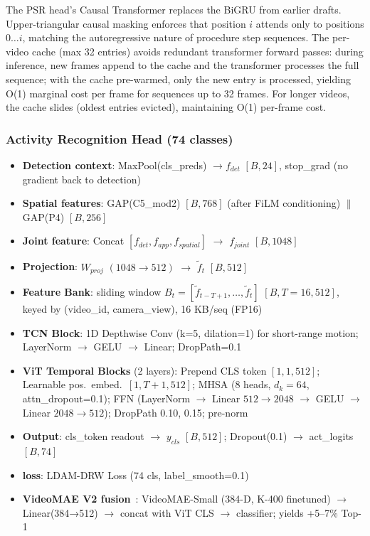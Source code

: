 \documentclass[11pt,a4paper]{article}
\begin{document}
The PSR head's Causal Transformer replaces the BiGRU from earlier drafts. Upper-triangular causal masking enforces that position $i$ attends only to positions $0\ldots i$, matching the autoregressive nature of procedure step sequences. The per-video cache (max 32 entries) avoids redundant transformer forward passes: during inference, new frames append to the cache and the transformer processes the full sequence; with the cache pre-warmed, only the new entry is processed, yielding O(1) marginal cost per frame for sequences up to 32 frames. For longer videos, the cache slides (oldest entries evicted), maintaining O(1) per-frame cost.

\subsubsection{Activity Recognition Head (74 classes)}
\begin{itemize}
\item \textbf{Detection context}: MaxPool(cls\_preds) $\rightarrow f_{det}$ $[B, 24]$, stop\_grad (no gradient back to detection)
\item \textbf{Spatial features}: GAP(C5\_mod2) $[B, 768]$ (after FiLM conditioning) $\|$ GAP(P4) $[B, 256]$
\item \textbf{Joint feature}: Concat $[f_{det}, f_{app}, f_{spatial}]$ $\rightarrow$ $f_{joint}$ $[B, 1048]$
\item \textbf{Projection}: $W_{proj}$ $(1048 \rightarrow 512)$ $\rightarrow$ $\tilde{f}_t$ $[B, 512]$
\item \textbf{Feature Bank}: sliding window $B_t = [\tilde{f}_{t-T+1}, \ldots, \tilde{f}_t]$ $[B, T=16, 512]$, keyed by (video\_id, camera\_view), 16 KB/seq (FP16)
\item \textbf{TCN Block}: 1D Depthwise Conv (k=5, dilation=1) for short-range motion; LayerNorm $\rightarrow$ GELU $\rightarrow$ Linear; DropPath=0.1
\item \textbf{ViT Temporal Blocks} (2 layers): Prepend CLS token $[1, 1, 512]$; Learnable pos.\ embed.\ $[1, T+1, 512]$; MHSA (8 heads, $d_k=64$, attn\_dropout=0.1); FFN (LayerNorm $\rightarrow$ Linear $512\rightarrow2048$ $\rightarrow$ GELU $\rightarrow$ Linear $2048\rightarrow512$); DropPath 0.10, 0.15; pre-norm
\item \textbf{Output}: cls\_token readout $\rightarrow$ $y_{cls}$ $[B, 512]$; Dropout(0.1) $\rightarrow$ act\_logits $[B, 74]$
\item \textbf{loss}: LDAM-DRW Loss (74 cls, label\_smooth=0.1)
\item \textbf{VideoMAE V2 fusion}~\cite{wang2023videomae}: VideoMAE-Small (384-D, K-400 finetuned) $\rightarrow$ Linear(384→512) $\rightarrow$ concat with ViT CLS $\rightarrow$ classifier; yields +5--7\% Top-1
\end{itemize}
\end{document}

